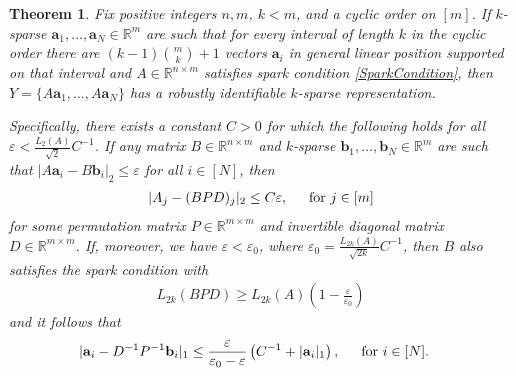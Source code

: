 \documentclass[journal, twocolumn]{IEEEtran}
\newtheorem{theorem}{Theorem}
\newtheorem{remark}{Remark}
\begin{document}
\begin{theorem}\label{DeterministicUniquenessTheorem}
Fix positive integers $n, m$, $k < m$, and a cyclic order on $[m]$. If $k$-sparse $\mathbf{a}_1, \ldots, \mathbf{a}_N \in \mathbb{R}^m$ are such that for every interval of length $k$ in the cyclic order there are \mbox{$(k-1){m \choose k}+1$} vectors $\mathbf{a}_i$ in general linear position supported on that interval and $A \in \mathbb{R}^{n \times m}$ satisfies spark condition \eqref{SparkCondition}, then $Y = \{A\mathbf{a}_1, \ldots, A\mathbf{a}_N\}$ has a robustly identifiable $k$-sparse representation.

Specifically, there exists a constant $C > 0$ for which the following holds for all $\varepsilon < \frac{L_2(A)}{\sqrt{2}}C^{-1}$. If any matrix $B \in \mathbb{R}^{n \times m}$ and $k$-sparse $\mathbf{b}_1, \ldots, \mathbf{b}_N \in \mathbb{R}^m$ are such that \mbox{$|A\mathbf{a}_i - B\mathbf{b}_i|_2 \leq \varepsilon$} for all $i \in [N]$, then
\begin{align}\label{Cstable}
|A_j-(BPD)_j|_2 \leq C\varepsilon,\indent  \text{for } j \in [m]
\end{align}
%
for some permutation matrix $P \in \mathbb{R}^{m \times m}$ and invertible diagonal matrix $D \in \mathbb{R}^{m \times m}$. If, moreover, we have $\varepsilon < \varepsilon_0$, where $\varepsilon_0 = \frac{L_{2k}(A)}{\sqrt{2k}}C^{-1}$, then $B$ also satisfies the spark condition with
\begin{align}
L_{2k}(BPD) \geq L_{2k}(A)\left( 1 - \frac{\varepsilon}{\varepsilon_0} \right)
\end{align}
and it follows that
\begin{align}\label{b-PDa}
|\mathbf{a}_i - D^{-1}P^{-1}\mathbf{b}_i|_1 &\leq \frac{\varepsilon }{ \varepsilon_0 - \varepsilon} \left( C^{-1}+|\mathbf{a}_i|_1 \right),\indent  \text{for } i \in [N].
\end{align}
\end{theorem}


\end{document}
